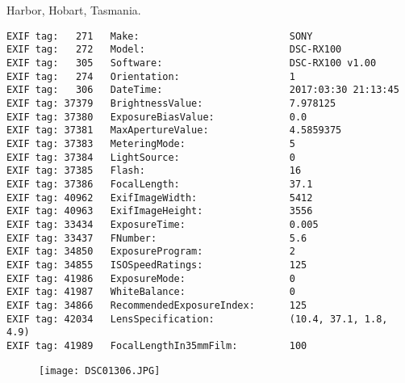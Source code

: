 \section{\protect{}}
\noindent Harbor, Hobart, Tasmania.
\noindent
\begin{lstlisting}
EXIF tag:   271   Make:                          SONY
EXIF tag:   272   Model:                         DSC-RX100
EXIF tag:   305   Software:                      DSC-RX100 v1.00
EXIF tag:   274   Orientation:                   1
EXIF tag:   306   DateTime:                      2017:03:30 21:13:45
EXIF tag: 37379   BrightnessValue:               7.978125
EXIF tag: 37380   ExposureBiasValue:             0.0
EXIF tag: 37381   MaxApertureValue:              4.5859375
EXIF tag: 37383   MeteringMode:                  5
EXIF tag: 37384   LightSource:                   0
EXIF tag: 37385   Flash:                         16
EXIF tag: 37386   FocalLength:                   37.1
EXIF tag: 40962   ExifImageWidth:                5412
EXIF tag: 40963   ExifImageHeight:               3556
EXIF tag: 33434   ExposureTime:                  0.005
EXIF tag: 33437   FNumber:                       5.6
EXIF tag: 34850   ExposureProgram:               2
EXIF tag: 34855   ISOSpeedRatings:               125
EXIF tag: 41986   ExposureMode:                  0
EXIF tag: 41987   WhiteBalance:                  0
EXIF tag: 34866   RecommendedExposureIndex:      125
EXIF tag: 42034   LensSpecification:             (10.4, 37.1, 1.8, 4.9)
EXIF tag: 41989   FocalLengthIn35mmFilm:         100

\end{lstlisting}
\clearpage
\begin{figure}
\raggedleft
\texttt{[image: DSC01306.JPG]}
\end{figure}


\clearpage
